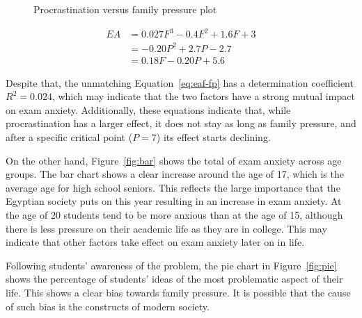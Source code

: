 \documentclass[12pt]{report}
\begin{document}
\begin{multicols}{2}
\begin{figure}[H]
    \caption{Procrastination versus family pressure plot}
    \label{fig:procrastination-family}
\end{figure}

\begin{align}
    \label{eq:eaf-f}
    EA &= 0.027 F^3 - 0.4 F^2 + 1.6 F + 3\\
       \label{eq:eaf-p}
       &= -0.20 P^2 + 2.7 P - 2.7\\
       \label{eq:eaf-fp}
       &= 0.18 F - 0.20 P + 5.6
\end{align}

Despite that, the unmatching Equation~\ref{eq:eaf-fp} has a determination
coefficient $R^2 = 0.024$, which may indicate that the two factors have a strong
mutual impact on exam anxiety. Additionally, these equations indicate that,
while procrastination has a larger effect, it does not stay as long as family
pressure, and after a specific critical point ($P=7$) its effect starts
declining.

On the other hand, Figure~\ref{fig:bar} shows the total of exam anxiety across
age groups. The bar chart shows a clear increase around the age of 17, which is
the average age for high school seniors. This reflects the large importance that
the Egyptian society puts on this year resulting in an increase in exam anxiety.
At the age of 20 students tend to be more anxious than at the age of 15,
although there is less pressure on their academic life as they are in college.
This may indicate that other factors take effect on exam anxiety later on in
life.

Following students' awareness of the problem, the pie chart in Figure~\ref{fig:pie} shows the percentage of students' ideas of the most problematic aspect of their life. This shows a clear bias towards family pressure. It is possible that the cause of such bias is the constructs of modern society. 


\end{multicols}
\end{document}
